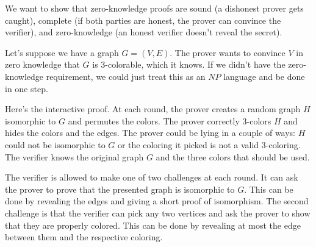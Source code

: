 \documentclass[twoside]{article}
\begin{document}
We want to show that zero-knowledge proofs are sound (a dishonest prover gets caught), complete (if both parties are honest, the prover can convince the verifier), and zero-knowledge (an honest verifier doesn't reveal the secret).  

Let's suppose we have a graph $G=(V,E)$.  The prover wants to convince $V$ in zero knowledge that $G$ is 3-colorable, which it knows.  If we didn't have the zero-knowledge requirement, we could just treat this as an $NP$ language and be done in one step.

Here's the interactive proof.  At each round, the prover creates a random graph $H$ isomorphic to $G$ and permutes the colors.  The prover correctly 3-colors $H$ and hides the colors and the edges.  The prover could be lying in a couple of ways: $H$ could not be isomorphic to $G$ or the coloring it picked is not a valid 3-coloring.  The verifier knows the original graph $G$ and the three colors that should be used.

The verifier is allowed to make one of two challenges at each round.  It can ask the prover to prove that the presented graph is isomorphic to $G$.  This can be done by revealing the edges and giving a short proof of isomorphism.  The second challenge is that the verifier can pick any two vertices and ask the prover to show that they are properly colored.  This can be done by revealing at most the edge between them and the respective coloring.
\end{document}
